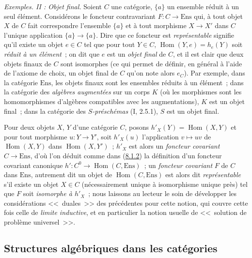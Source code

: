 \begin{env}[8.1.10]
\label{0.8.1.10-fr}
\textit{Exemples. II : Objet final.} Soient $C$ une catégorie, $\{a\}$ un
ensemble réduit à un seul élément. Considérons le foncteur contravariant
$F:C\to\mathrm{Ens}$ qui, à tout objet $X$ de $C$ fait correspondre
l'ensemble $\{a\}$ et à tout morphisme $X\to X'$ dans $C$ l'unique
application $\{a\}\to\{a\}$. Dire que ce foncteur est \emph{représentable}
signifie qu'il existe un objet $e\in C$ tel que pour tout $Y\in C$,
$\operatorname{Hom}(Y,e)=h_e(Y)$ soit \emph{réduit à un élément}~; on dit
que $e$ est un \emph{objet final} de $C$, et il est clair que deux objets
finaux de $C$ sont isomorphes (ce qui permet de définir, en général à l'aide
de l'axiome de choix, un objet final de $C$ qu'on note alors $e_C$). Par
exemple, dans la catégorie $\mathrm{Ens}$, les objets finaux sont les
ensembles réduits à un élément~; dans la catégorie des \emph{algèbres
augmentées} sur un corps $K$ (où les morphismes sont les homomorphismes
d'algèbres compatibles avec les augmentations), $K$ est un objet final~;
dans la catégorie des \emph{$S$-préschémas} (I, 2.5.1), $S$ est un objet
final.
\end{env}

\begin{env}[8.1.11]
\label{0.8.1.11-fr}
Pour deux objets $X$, $Y$ d'une catégorie $C$, posons
$h'_X(Y)=\operatorname{Hom}(X,Y)$ et pour tout morphisme $u:Y\to Y'$, soit
$h'_X(u)$ l'application $v\mapsto uv$ de $\operatorname{Hom}(X,Y)$ dans
$\operatorname{Hom}(X,Y')$~; $h'_X$ est alors un \emph{foncteur covariant}
$C\to\mathrm{Ens}$, d'où l'on déduit comme dans
(\hyperref[0.8.1.2-fr]{8.1.2}) la définition d'un foncteur covariant
canonique $h':C^0\to\operatorname{Hom}(C,\mathrm{Ens})$~; un \emph{foncteur
covariant} $F$ de $C$ dans $\mathrm{Ens}$, autrement dit un objet de
$\operatorname{Hom}(C,\mathrm{Ens})$ est alors dit \emph{représentable}
s'il existe un objet $X\in C$ (nécessairement unique à isomorphisme unique
près) tel que $F$ soit \emph{isomorphe à $h'_X$}~; nous laissons au lecteur
le soin de développer les considérations <<~duales~>> des précédentes pour
cette notion, qui couvre cette fois celle de \emph{limite inductive}, et en
particulier la notion usuelle de <<~solution de problème universel~>>.
\end{env}

\subsection{Structures algébriques dans les catégories}
\label{subsection:0.8.2-fr}

